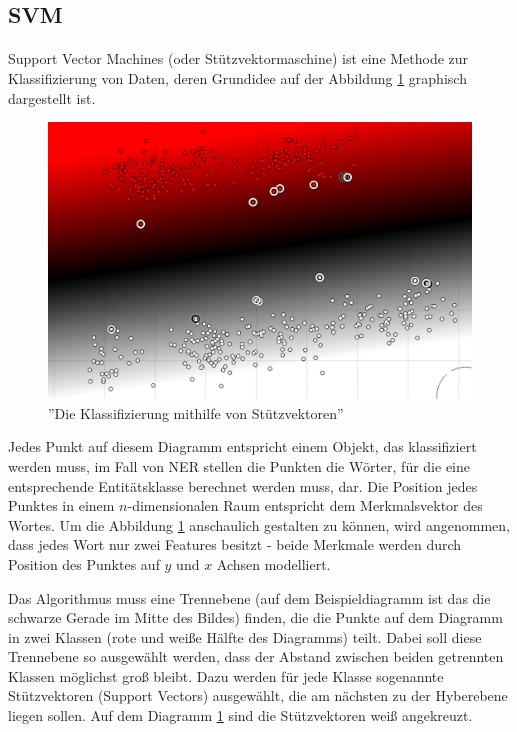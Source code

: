\subsection{SVM} \label{sec:SVNGRUND}
\paragraph{}
Support Vector Machines (oder Stützvektormaschine) ist eine Methode zur Klassifizierung von Daten, deren Grundidee\cite{meyer2014support} auf der Abbildung \ref{fig:SVM-INTRO} graphisch dargestellt ist. 

\begin{figure}
\centering
\includegraphics[width=\textwidth,angle=90]{Bilder/svm-intro.png}
\caption{''Die Klassifizierung mithilfe von Stützvektoren''}
\label{fig:SVM-INTRO}
\end{figure}

Jedes Punkt auf diesem Diagramm entspricht einem Objekt, das klassifiziert werden muss, im Fall von NER stellen die Punkten die Wörter, für die eine entsprechende Entitätsklasse berechnet werden muss, dar. Die Position jedes Punktes in einem $n$-dimensionalen Raum entspricht dem Merkmalsvektor des Wortes. Um die Abbildung \ref{fig:SVM-INTRO} anschaulich gestalten zu können, wird angenommen, dass jedes Wort nur zwei Features besitzt - beide Merkmale werden durch Position des Punktes auf $y$ und $x$ Achsen modelliert.

Das Algorithmus muss eine Trennebene (auf dem Beispieldiagramm ist das die schwarze Gerade im Mitte des Bildes) finden, die die Punkte auf dem Diagramm in zwei Klassen (rote und weiße Hälfte des Diagramms) teilt. Dabei soll diese Trennebene so ausgewählt werden, dass der Abstand zwischen beiden getrennten Klassen möglichst groß bleibt. Dazu werden für jede Klasse sogenannte Stützvektoren (Support Vectors) ausgewählt, die am nächsten zu der Hyberebene liegen sollen. Auf dem Diagramm \ref{fig:SVM-INTRO} sind die Stützvektoren weiß angekreuzt.

